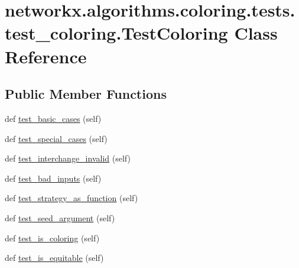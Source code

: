 \hypertarget{classnetworkx_1_1algorithms_1_1coloring_1_1tests_1_1test__coloring_1_1TestColoring}{}\section{networkx.\+algorithms.\+coloring.\+tests.\+test\+\_\+coloring.\+Test\+Coloring Class Reference}
\label{classnetworkx_1_1algorithms_1_1coloring_1_1tests_1_1test__coloring_1_1TestColoring}
\subsection*{Public Member Functions}
\begin{DoxyCompactItemize}
\item 
def \hyperlink{classnetworkx_1_1algorithms_1_1coloring_1_1tests_1_1test__coloring_1_1TestColoring_a199991f4c2c670ab3dc44116c93f22f2}{test\+\_\+basic\+\_\+cases} (self)
\item 
def \hyperlink{classnetworkx_1_1algorithms_1_1coloring_1_1tests_1_1test__coloring_1_1TestColoring_a873a572b2abd7c5dfc66656f148a3bac}{test\+\_\+special\+\_\+cases} (self)
\item 
def \hyperlink{classnetworkx_1_1algorithms_1_1coloring_1_1tests_1_1test__coloring_1_1TestColoring_a08102711509dc27c145eb9d155f3f415}{test\+\_\+interchange\+\_\+invalid} (self)
\item 
def \hyperlink{classnetworkx_1_1algorithms_1_1coloring_1_1tests_1_1test__coloring_1_1TestColoring_a2a89d379d45358cd0febc53e8acbacef}{test\+\_\+bad\+\_\+inputs} (self)
\item 
def \hyperlink{classnetworkx_1_1algorithms_1_1coloring_1_1tests_1_1test__coloring_1_1TestColoring_ab22f0d26e4ddfa170433f3dc02301f9f}{test\+\_\+strategy\+\_\+as\+\_\+function} (self)
\item 
def \hyperlink{classnetworkx_1_1algorithms_1_1coloring_1_1tests_1_1test__coloring_1_1TestColoring_a5c244ffafae172266463afcc98987888}{test\+\_\+seed\+\_\+argument} (self)
\item 
def \hyperlink{classnetworkx_1_1algorithms_1_1coloring_1_1tests_1_1test__coloring_1_1TestColoring_a87591fef3168f924b7d0e1a76fd62735}{test\+\_\+is\+\_\+coloring} (self)
\item 
def \hyperlink{classnetworkx_1_1algorithms_1_1coloring_1_1tests_1_1test__coloring_1_1TestColoring_a82777922815a7b3bf80f93bdbde5a29c}{test\+\_\+is\+\_\+equitable} (self)

\end{DoxyCompactItemize}
